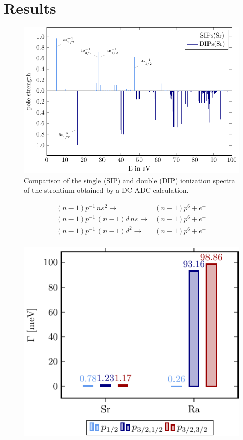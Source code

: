 \section{Results}
\label{section:results}

\begin{figure}[h]
 \centering
 \includegraphics[width=0.9\columnwidth]{pics/Sr_rel_sdip.pdf}
 \caption{Comparison of the single (SIP) and double (DIP) ionization spectra
          of the strontium obtained by a DC-ADC calculation.}
 \label{fig:sdip}
\end{figure}




\begin{align*}
 (n-1)p^{-1} \,ns^2         \rightarrow & (n-1)p^6 + e^- \\
 (n-1)p^{-1} \,(n-1)d \, ns \rightarrow & (n-1)p^6 + e^- \\
 (n-1)p^{-1} \,(n-1)d^2     \rightarrow & (n-1)p^6 + e^- \\
\end{align*}


\begin{figure}[h]
 \centering
 \includegraphics[width=\columnwidth]{pics/sr_ba_ra.pdf}
\end{figure}


